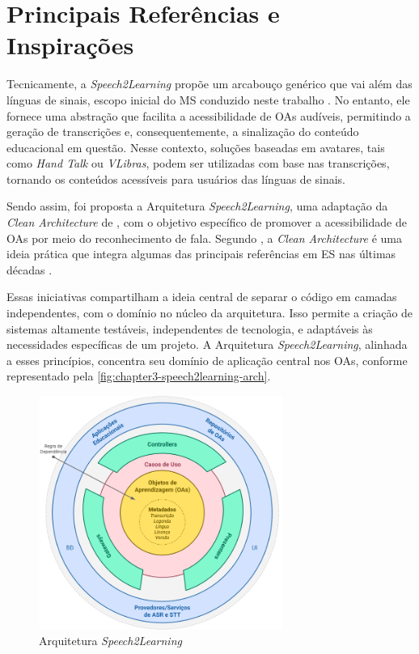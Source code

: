 \section{Principais Referências e Inspirações}

Tecnicamente, a \textit{Speech2Learning} propõe um arcabouço genérico que vai além das línguas de sinais, escopo inicial do MS conduzido neste trabalho \cite{FalvoJr2020_SBIE, FalvoJr2020_FIE, FalvoJr2021_RENOTE}. No entanto, ele fornece uma abstração que facilita a acessibilidade de OAs audíveis, permitindo a geração de transcrições e, consequentemente, a sinalização do conteúdo educacional em questão. Nesse contexto, soluções baseadas em avatares, tais como \textit{Hand Talk} ou \textit{VLibras}, podem ser utilizadas com base nas transcrições, tornando os conteúdos acessíveis para usuários das línguas de sinais.

Sendo assim, foi proposta a Arquitetura \textit{Speech2Learning}, uma adaptação da \textit{Clean Architecture} de , com o objetivo específico de promover a acessibilidade de OAs por meio do reconhecimento de fala. Segundo , a \textit{Clean Architecture} é uma ideia prática que integra algumas das principais referências em ES nas últimas décadas \cite{cockburn2005, freeman2009, palermo2008, coplien2012, reenskaug2009, jacobson1992}. 

Essas iniciativas compartilham a ideia central de separar o código em camadas independentes, com o domínio no núcleo da arquitetura. Isso permite a criação de sistemas altamente testáveis, independentes de tecnologia, e adaptáveis às necessidades específicas de um projeto. A Arquitetura \textit{Speech2Learning}, alinhada a esses princípios, concentra seu domínio de aplicação central nos OAs, conforme representado pela \autoref{fig:chapter3-speech2learning-arch}. 

\begin{figure}[htb]
\centering
\caption{Arquitetura \textit{Speech2Learning}}
\label{fig:chapter3-speech2learning-arch}
\includegraphics[width=0.71\textwidth]{images/chapter3-speech2learning-arch.png}
\end{figure}

